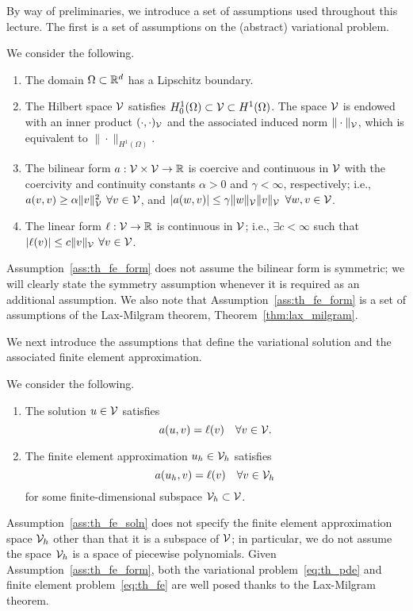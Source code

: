 By way of preliminaries, we introduce a set of assumptions used throughout this lecture.  The first is a set of assumptions on the (abstract) variational problem.
\begin{assumption}
  \label{ass:th_fe_form}
  We consider the following.
  \begin{enumerate}
  \item The domain $\Omega \subset \mathbb{R}^d$ has a Lipschitz boundary.
  \item The Hilbert space $\mathcal{V}$ satisfies $H^1_0(\Omega) \subset \mathcal{V} \subset H^1(\Omega)$. The space $\mathcal{V}$ is endowed with an inner product $(\cdot,\cdot)_{\mathcal{V}}$ and the associated induced norm $\| \cdot \|_{\mathcal{V}}$, which is equivalent to $\| \cdot \|_{H^1(\Omega)}$.
  \item The bilinear form $a: \mathcal{V} \times \mathcal{V} \to \mathbb{R}$ is coercive and continuous in $\mathcal{V}$ with the coercivity and continuity constants $\alpha > 0$ and $\gamma < \infty$, respectively; i.e., $a(v,v) \geq \alpha \| v \|_{\mathcal{V}}^2$ $\forall v \in \mathcal{V}$, and $|a(w,v)| \leq \gamma \| w\|_{\mathcal{V}} \| v \|_{\mathcal{V}}$ $\forall w,v \in \mathcal{V}$.
  \item The linear form $\ell: \mathcal{V} \to \mathbb{R}$ is continuous in $\mathcal{V}$; i.e., $\exists c < \infty$ such that $|\ell(v)| \leq c \| v \|_{\mathcal{V}}$ $\forall v \in \mathcal{V}$.
  \end{enumerate}
\end{assumption}
Assumption~\ref{ass:th_fe_form} does not assume the bilinear form is symmetric; we will clearly state the symmetry assumption whenever it is required as an additional assumption.  We also note that Assumption~\ref{ass:th_fe_form} is a set of assumptions of the Lax-Milgram theorem, Theorem~\ref{thm:lax_milgram}.

We next introduce the assumptions that define the variational solution and the associated finite element approximation.
\begin{assumption}
  \label{ass:th_fe_soln}
  We consider the following.
  \begin{enumerate}
  \item The solution $u \in \mathcal{V}$ satisfies
    \begin{equation}
      \label{eq:th_pde}
      a(u,v) = \ell(v) \quad \forall v \in \mathcal{V}.
    \end{equation}
  \item The finite element approximation $u_h \in \mathcal{V}_h$ satisfies
    \begin{equation}
      \label{eq:th_fe}
      a(u_h,v) = \ell(v) \quad \forall v \in \mathcal{V}_h
    \end{equation}
    for some finite-dimensional subspace $\mathcal{V}_h \subset \mathcal{V}$.
  \end{enumerate}
\end{assumption}
Assumption~\ref{ass:th_fe_soln} does not specify the finite element approximation space $\mathcal{V}_h$ other than that it is a subspace of $\mathcal{V}$; in particular, we do not assume the space $\mathcal{V}_h$ is a space of piecewise polynomials.  Given Assumption~\ref{ass:th_fe_form}, both the variational problem~\eqref{eq:th_pde} and finite element problem~\eqref{eq:th_fe} are well posed thanks to the Lax-Milgram theorem.

